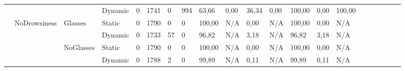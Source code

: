 \documentclass[12pt]{article}
\begin{document}
\begin{landscape}
\begin{table}[]
\begin{adjustbox}{width=1.4\textwidth}
\begin{tabular}{lllllllllllllllccllll}
				\multicolumn{1}{|l|}{} & \multicolumn{1}{l|}{} & \multicolumn{1}{l|}{} & \multicolumn{1}{l|}{Dynamic} & \multicolumn{1}{l|}{0} & \multicolumn{1}{l|}{1741} & \multicolumn{1}{l|}{0} & \multicolumn{1}{l|}{994} & \multicolumn{1}{l|}{63,66} & \multicolumn{1}{l|}{0,00} & \multicolumn{1}{l|}{36,34} & \multicolumn{1}{l|}{0,00} & \multicolumn{1}{l|}{100,00} & \multicolumn{1}{l|}{0,00} & \multicolumn{1}{l|}{100,00} & \multicolumn{1}{c|}{} & \multicolumn{1}{c|}{} & \multicolumn{1}{l|}{} & \multicolumn{1}{l|}{} & \multicolumn{1}{l|}{} & \multicolumn{1}{l|}{} \\ \cline{2-15}
				\multicolumn{1}{|l|}{} & \multicolumn{1}{l|}{\multirow{4}{*}{NoDrowsiness}} & \multicolumn{1}{l|}{\multirow{2}{*}{Glasses}} & \multicolumn{1}{l|}{Static} & \multicolumn{1}{l|}{0} & \multicolumn{1}{l|}{1790} & \multicolumn{1}{l|}{0} & \multicolumn{1}{l|}{0} & \multicolumn{1}{l|}{100,00} & \multicolumn{1}{l|}{N/A} & \multicolumn{1}{l|}{0,00} & \multicolumn{1}{l|}{N/A} & \multicolumn{1}{l|}{100,00} & \multicolumn{1}{l|}{0,00} & \multicolumn{1}{l|}{N/A} & \multicolumn{1}{c|}{} & \multicolumn{1}{c|}{} & \multicolumn{1}{l|}{} & \multicolumn{1}{l|}{} & \multicolumn{1}{l|}{} & \multicolumn{1}{l|}{} \\ \cline{4-15}
				\multicolumn{1}{|l|}{} & \multicolumn{1}{l|}{} & \multicolumn{1}{l|}{} & \multicolumn{1}{l|}{Dynamic} & \multicolumn{1}{l|}{0} & \multicolumn{1}{l|}{1733} & \multicolumn{1}{l|}{57} & \multicolumn{1}{l|}{0} & \multicolumn{1}{l|}{96,82} & \multicolumn{1}{l|}{N/A} & \multicolumn{1}{l|}{3,18} & \multicolumn{1}{l|}{N/A} & \multicolumn{1}{l|}{96,82} & \multicolumn{1}{l|}{3,18} & \multicolumn{1}{l|}{N/A} & \multicolumn{1}{c|}{} & \multicolumn{1}{c|}{} & \multicolumn{1}{l|}{} & \multicolumn{1}{l|}{} & \multicolumn{1}{l|}{} & \multicolumn{1}{l|}{} \\ \cline{3-15}
				\multicolumn{1}{|l|}{} & \multicolumn{1}{l|}{} & \multicolumn{1}{l|}{\multirow{2}{*}{NoGlasses}} & \multicolumn{1}{l|}{Static}  & \multicolumn{1}{l|}{0} & \multicolumn{1}{l|}{1790} & \multicolumn{1}{l|}{0} & \multicolumn{1}{l|}{0} & \multicolumn{1}{l|}{100,00} & \multicolumn{1}{l|}{N/A} & \multicolumn{1}{l|}{0,00} & \multicolumn{1}{l|}{N/A} & \multicolumn{1}{l|}{100,00} & \multicolumn{1}{l|}{0,00} & \multicolumn{1}{l|}{N/A} & \multicolumn{1}{c|}{} & \multicolumn{1}{c|}{} & \multicolumn{1}{l|}{} & \multicolumn{1}{l|}{} & \multicolumn{1}{l|}{} & \multicolumn{1}{l|}{} \\ \cline{4-15}
				\multicolumn{1}{|l|}{} & \multicolumn{1}{l|}{} & \multicolumn{1}{l|}{} & \multicolumn{1}{l|}{Dynamic} & \multicolumn{1}{l|}{0} & \multicolumn{1}{l|}{1788} & \multicolumn{1}{l|}{2} & \multicolumn{1}{l|}{0} & \multicolumn{1}{l|}{99,89} & \multicolumn{1}{l|}{N/A} & \multicolumn{1}{l|}{0,11} & \multicolumn{1}{l|}{N/A} & \multicolumn{1}{l|}{99,89} & \multicolumn{1}{l|}{0,11} & \multicolumn{1}{l|}{N/A} & \multicolumn{1}{c|}{} & \multicolumn{1}{c|}{} & \multicolumn{1}{l|}{} & \multicolumn{1}{l|}{} & \multicolumn{1}{l|}{} & \multicolumn{1}{l|}{} \\ \hline

\end{tabular}
\end{adjustbox}
\end{table}
\end{landscape}
\end{document}

